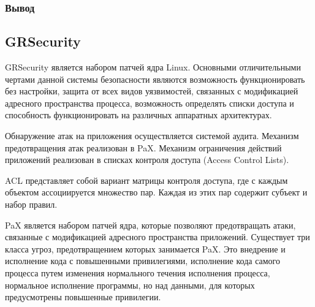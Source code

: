 \subsubsection{Вывод}

\subsection{GRSecurity} 
 
GRSecurity является набором патчей ядра Linux.
Основными отличительными чертами данной системы 
безопасности являются возможность функционировать 
без настройки, защита от всех видов уязвимостей, 
связанных с модификацией адресного пространства 
процесса, возможность определять списки доступа и 
способность функционировать на различных аппаратных 
архитектурах. 

Обнаружение атак на приложения осуществляется
системой аудита. Механизм предотвращения атак 
реализован в PaX. Механизм ограничения действий 
приложений реализован в списках контроля доступа
(Access Control Lists). 

ACL представляет собой  вариант матрицы контроля доступа, где с 
каждым объектом ассоциируется множество пар. 
Каждая из этих пар содержит субъект и набор правил. 

PaX является набором патчей ядра, которые позволяют 
предотвращать атаки, связанные с модификацией адресного
пространства приложений. 
Существует три класса угроз, предотвращением которых 
занимается PaX. Это внедрение и исполнение кода с 
повышенными привилегиями, исполнение кода самого 
процесса путем изменения нормального течения 
исполнения процесса, нормальное исполнение программы, 
но над данными, для которых предусмотрены повышенные 
привилегии. 

\begin{comment}
Non-executable pages (NOEXEC) и mmap/mprotect 
(MPROTECT) предотвращают внедрение и исполнение 
кода с повышенными привилегиями. 
Address Layout Randomisation (ASLR) 
позволяет предотвратить все три упомянутые вида атак в той 
ситуации, когда атакующий заранее закладывается на 
адреса в атакуемом процессе и не может узнать о них 
в процессе исполнения. Так как PaX полностью внедрен 
в ядро, предполагается то, что ядро является Trusted 
Computer Base. Инструментарий позволяет предотвратить 
исполнение стека, обеспечить рандомизацию 
размещения адресов внутри адресного пространства 
(address space layout randomization) . 
Основная цель данного проекта — изучение различных защитных 
механизмов, защищающих от эксплойтов уязвимостей ПО, которые 
предоставляют злоумышленнику полные права на чтение/запись в 
системе. Исполнение кода связано с необходимостью изменять 
ход выполнения процесса используя уже существующий код. Одна 
из основных проблем — подмена адресов возврата из функций и 
подмена самих адресов функций. Для установки PaX требуется 
наложить патч на дерево исходных кодов ядра, после чего собрать 
ядро и установить в систему. 
\end{comment}

